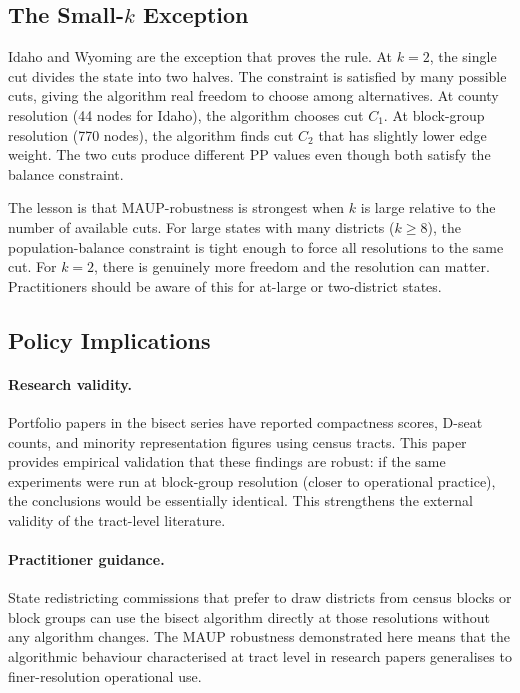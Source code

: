 \subsection{The Small-$k$ Exception}

Idaho and Wyoming are the exception that proves the rule.  At $k=2$, the
single cut divides the state into two halves.  The constraint is
satisfied by many possible cuts, giving the algorithm real freedom to choose
among alternatives.  At county resolution (44 nodes for Idaho), the algorithm
chooses cut $C_1$.  At block-group resolution (770 nodes), the algorithm
finds cut $C_2$ that has slightly lower edge weight.  The two cuts produce
different PP values even though both satisfy the balance constraint.

The lesson is that MAUP-robustness is strongest when $k$ is large relative to
the number of available cuts.  For large states with many districts ($k \geq
8$), the population-balance constraint is tight enough to force all
resolutions to the same cut.  For $k=2$, there is genuinely more freedom and
the resolution can matter.  Practitioners should be aware of this for at-large
or two-district states.

\subsection{Policy Implications}

\paragraph{Research validity.}
Portfolio papers in the bisect series have reported compactness scores,
D-seat counts, and minority representation figures using census tracts.
This paper provides empirical validation that these findings are robust: if
the same experiments were run at block-group resolution (closer to operational
practice), the conclusions would be essentially identical.  This strengthens
the external validity of the tract-level literature.

\paragraph{Practitioner guidance.}
State redistricting commissions that prefer to draw districts from census
blocks or block groups can use the bisect algorithm directly at those
resolutions without any algorithm changes.  The MAUP robustness demonstrated
here means that the algorithmic behaviour characterised at tract level in
research papers generalises to finer-resolution operational use.

